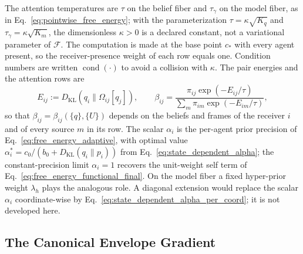 The attention temperatures are $\tau$ on the belief fiber and $\tau_\gamma$ on the model fiber, as in Eq.~\eqref{eq:pointwise_free_energy}; with the parameterization $\tau = \kappa\sqrt{K_q}$ and $\tau_\gamma = \kappa\sqrt{K_m}$, the dimensionless $\kappa > 0$ is a declared constant, not a variational parameter of $\mathcal{F}$. The computation is made at the base point $c_*$ with every agent present, so the receiver-presence weight of each row equals one. Condition numbers are written $\operatorname{cond}(\cdot)$ to avoid a collision with $\kappa$. The pair energies and the attention rows are
\begin{equation}
E_{ij} := D_{\mathrm{KL}}(q_i \| \Omega_{ij}[q_j]),
\qquad
\beta_{ij} = \frac{\pi_{ij}\exp\left(-E_{ij}/\tau\right)}{\sum_m \pi_{im}\exp\left(-E_{im}/\tau\right)},
\end{equation}
so that $\beta_{ij} = \beta_{ij}(\{q\},\{U\})$ depends on the beliefs and frames of the receiver $i$ and of every source $m$ in its row. The scalar $\alpha_i$ is the per-agent prior precision of Eq.~\eqref{eq:free_energy_adaptive}, with optimal value $\alpha_i^* = c_0/(b_0 + D_{\mathrm{KL}}(q_i \| p_i))$ from Eq.~\eqref{eq:state_dependent_alpha}; the constant-precision limit $\alpha_i = 1$ recovers the unit-weight self term of Eq.~\eqref{eq:free_energy_functional_final}. On the model fiber a fixed hyper-prior weight $\lambda_h$ plays the analogous role. A diagonal extension would replace the scalar $\alpha_i$ coordinate-wise by Eq.~\eqref{eq:state_dependent_alpha_per_coord}; it is not developed here.

\subsection*{The Canonical Envelope Gradient}

